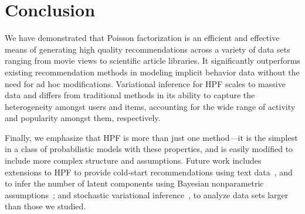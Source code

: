 \section{Conclusion}
We have demonstrated that Poisson factorization is an efficient and
effective means of generating high quality recommendations across a
variety of data sets ranging from movie views to scientific article
libraries. It significantly outperforms existing recommendation
methods in modeling implicit behavior data without the need for ad hoc
modifications. Variational inference for HPF scales to massive data
and differs from traditional methods in its ability to capture the
heterogeneity amongst users and items, accounting for the wide range
of activity and popularity amongst them, respectively.


Finally, we emphasize that HPF is more than just one method---it is
the simplest in a class of probabilistic models with these properties,
and is easily modified to include more complex structure and
assumptions.  Future work includes extensions to HPF to provide
cold-start recommendations using text data~\cite{Wang:2011b}, and to
infer the number of latent components using Bayesian nonparametric
assumptions~\cite{Zhou:2012}; and stochastic variational
inference~\cite{Hoffman:2013}, to analyze data sets larger than those
we studied.





